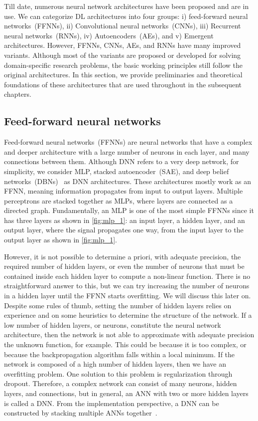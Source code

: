 \hspace*{3.5mm} Till date, numerous neural network architectures have been proposed and are in use. We can categorize DL architectures into four groups: i) feed-forward neural networks~(FFNNs), ii) Convolutional neural networks~(CNNs), iii) Recurrent neural networks~(RNNs), iv) Autoencoders~(AEs), and v) Emergent architectures. However, FFNNs, CNNs, AEs, and RNNs have many improved variants. Although most of the variants are proposed or developed for solving domain-specific research problems, the basic working principles still follow the original  architectures. In this section, we provide preliminaries and theoretical foundations of these architectures that are used throughout in the subsequent chapters.  

\subsection{Feed-forward neural networks}
Feed-forward neural networks~(FFNNs) are neural networks that have a complex and deeper architecture with a large number of neurons in each layer, and many connections between them. Although DNN refers to a very deep network, for simplicity, we consider MLP, stacked autoencoder~(SAE), and deep belief networks~(DBNs)~\cite{Hinton:2009} as DNN architectures. These architectures mostly work as an FFNN, meaning information propagates from input to output layers. Multiple perceptrons are stacked together as MLPs, where layers are connected as a directed graph. Fundamentally, an MLP is one of the most simple FFNNs since it has three layers as shown in \cref{fig:mlp_1}: an input layer, a hidden layer, and an output layer, where the signal propagates one way, from the input layer to the output layer as shown in \cref{fig:mlp_1}.

\hspace*{3.5mm} However, it is not possible to determine a priori, with adequate precision, the required number of hidden layers, or even the number of neurons that must be contained inside each hidden layer to compute a non-linear function. There is no straightforward answer to this, but we can try increasing the number of neurons in a hidden layer until the FFNN starts overfitting. We will discuss this later on. Despite some rules of thumb, setting the number of hidden layers relies on experience and on some heuristics to determine the structure of the network. If a low number of hidden layers, or neurons, constitute the neural network architecture, then the network is not able to approximate with adequate precision the unknown function, for example. This could be because it is too complex, or because the backpropagation algorithm falls within a local minimum. If the network is composed of a high number of hidden layers, then we have an overfitting problem. One solution to this problem is regularization through dropout. Therefore, a complex network can consist of many neurons, hidden layers, and connections, but in general, an ANN with two or more hidden layers is called a DNN. From the implementation perspective, a DNN can be constructed by stacking multiple ANNs together~\cite{karimDLTF2018}.

